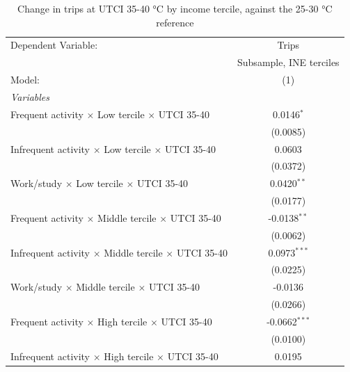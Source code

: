 
\begin{table}[htbp]
   \caption{\label{table_model_d_35-40} Change in trips at UTCI 35-40 °C by income tercile, against the 25-30 °C reference}
   \centering
   \small
   \begin{tabular}{lc}
      \tabularnewline \midrule \midrule
      Dependent Variable:                                               & Trips\\  
                                                                        & Subsample, INE terciles \\   
      Model:                                                            & (1)\\  
      \midrule
      \emph{Variables}\\
      Frequent activity $\times$ Low tercile $\times$ UTCI 35-40        & 0.0146$^{*}$\\   
                                                                        & (0.0085)\\   
      Infrequent activity $\times$ Low tercile $\times$ UTCI 35-40      & 0.0603\\   
                                                                        & (0.0372)\\   
      Work/study $\times$ Low tercile $\times$ UTCI 35-40               & 0.0420$^{**}$\\   
                                                                        & (0.0177)\\   
      Frequent activity $\times$ Middle tercile $\times$ UTCI 35-40     & -0.0138$^{**}$\\   
                                                                        & (0.0062)\\   
      Infrequent activity $\times$ Middle tercile $\times$ UTCI 35-40   & 0.0973$^{***}$\\   
                                                                        & (0.0225)\\   
      Work/study $\times$ Middle tercile $\times$ UTCI 35-40            & -0.0136\\   
                                                                        & (0.0266)\\   
      Frequent activity $\times$ High tercile $\times$ UTCI 35-40       & -0.0662$^{***}$\\   
                                                                        & (0.0100)\\   
      Infrequent activity $\times$ High tercile $\times$ UTCI 35-40     & 0.0195\\   

\end{tabular}
\end{table}
